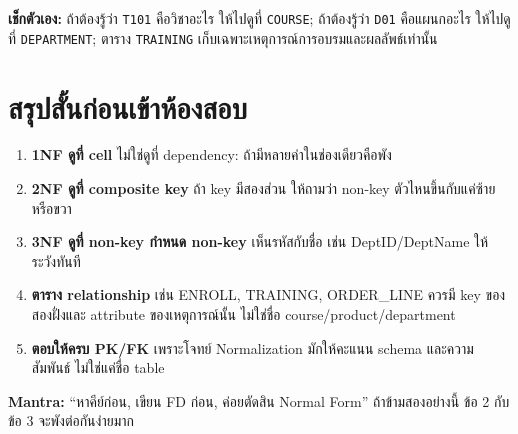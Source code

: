 \documentclass[a4paper,12pt]{article}
\newcommand{\schema}[1]{\texttt{#1}}
\begin{document}
\noindent\textbf{เช็กตัวเอง:} ถ้าต้องรู้ว่า \schema{T101} คือวิชาอะไร ให้ไปดูที่ \schema{COURSE}; ถ้าต้องรู้ว่า \schema{D01} คือแผนกอะไร ให้ไปดูที่ \schema{DEPARTMENT}; ตาราง \schema{TRAINING} เก็บเฉพาะเหตุการณ์การอบรมและผลลัพธ์เท่านั้น

\newpage
\section*{สรุปสั้นก่อนเข้าห้องสอบ}

\begin{enumerate}[label=\textbf{\arabic*.}]
    \item \textbf{1NF ดูที่ cell} ไม่ใช่ดูที่ dependency: ถ้ามีหลายค่าในช่องเดียวคือพัง
    \item \textbf{2NF ดูที่ composite key} ถ้า key มีสองส่วน ให้ถามว่า non-key ตัวไหนขึ้นกับแค่ซ้ายหรือขวา
    \item \textbf{3NF ดูที่ non-key กำหนด non-key} เห็นรหัสกับชื่อ เช่น DeptID/DeptName ให้ระวังทันที
    \item \textbf{ตาราง relationship} เช่น ENROLL, TRAINING, ORDER\_LINE ควรมี key ของสองฝั่งและ attribute ของเหตุการณ์นั้น ไม่ใช่ชื่อ course/product/department
    \item \textbf{ตอบให้ครบ PK/FK} เพราะโจทย์ Normalization มักให้คะแนน schema และความสัมพันธ์ ไม่ใช่แค่ชื่อ table
\end{enumerate}

\vspace{0.3cm}
\noindent\textbf{Mantra:} ``หาคีย์ก่อน, เขียน FD ก่อน, ค่อยตัดสิน Normal Form'' ถ้าข้ามสองอย่างนี้ ข้อ 2 กับข้อ 3 จะพังต่อกันง่ายมาก
\end{document}
